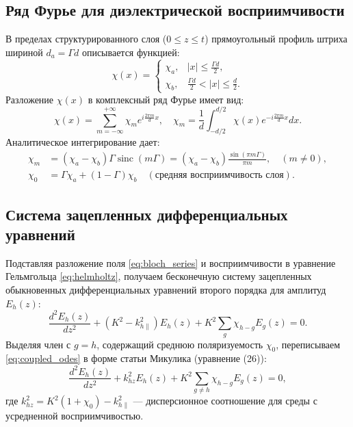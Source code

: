 \documentclass[a4paper,11pt]{article}
\begin{document}
\subsection{Ряд Фурье для диэлектрической восприимчивости}
В пределах структурированного слоя ($0 \le z \le t$) прямоугольный профиль штриха шириной $d_a = \Gamma d$ описывается функцией:
\begin{equation}
\chi(x) = \begin{cases}
\chi_a, & |x| \le \frac{\Gamma d}{2}, \\
\chi_b, & \frac{\Gamma d}{2} < |x| \le \frac{d}{2}.
\end{cases}
\end{equation}
Разложение $\chi(x)$ в комплексный ряд Фурье имеет вид:
\begin{equation}
\chi(x) = \sum_{m=-\infty}^{+\infty} \chi_m e^{i \frac{2\pi m}{d} x}, \quad \chi_m = \frac{1}{d} \int_{-d/2}^{d/2} \chi(x) e^{-i \frac{2\pi m}{d} x} dx.
\end{equation}
Аналитическое интегрирование дает:
\begin{align}
\chi_m &= (\chi_a - \chi_b) \Gamma \operatorname{sinc}(m\Gamma) = (\chi_a - \chi_b) \frac{\sin(\pi m \Gamma)}{\pi m}, \quad (m \neq 0), \\
\chi_0 &= \Gamma \chi_a + (1 - \Gamma) \chi_b \quad (\text{средняя восприимчивость слоя}).
\end{align}

\subsection{Система зацепленных дифференциальных уравнений}
Подставляя разложение поля \eqref{eq:bloch_series} и восприимчивости в уравнение Гельмгольца \eqref{eq:helmholtz}, получаем бесконечную систему зацепленных обыкновенных дифференциальных уравнений второго порядка для амплитуд $E_h(z)$:
\begin{equation}
\frac{d^2 E_h(z)}{dz^2} + \left( K^2 - k_{h\parallel}^2 \right) E_h(z) + K^2 \sum_{g} \chi_{h-g} E_g(z) = 0.
\label{eq:coupled_odes}
\end{equation}
Выделяя член с $g = h$, содержащий среднюю поляризуемость $\chi_0$, переписываем \eqref{eq:coupled_odes} в форме статьи Микулика (уравнение (26)):
\begin{equation}
\frac{d^2 E_h(z)}{dz^2} + k_{hz}^2 E_h(z) + K^2 \sum_{g \neq h} \chi_{h-g} E_g(z) = 0,
\end{equation}
где $k_{hz}^2 = K^2 (1 + \chi_0) - k_{h\parallel}^2$ --- дисперсионное соотношение для среды с усредненной восприимчивостью.
\end{document}
